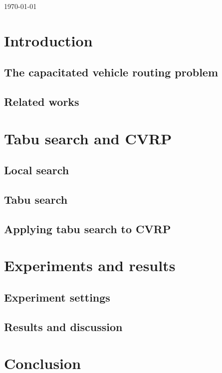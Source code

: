 \documentclass{report}
\begin{document}
\begin{titlepage}


	\vfill\vfill\vfill %

	{\large\today} %



	\vfill %
\end{titlepage}

\tableofcontents
\pagebreak

\chapter{Introduction}
\section{The capacitated vehicle routing problem}

\section{Related works}

\chapter{Tabu search and CVRP}
\section{Local search}

\section{Tabu search}

\section{Applying tabu search to CVRP}

\chapter{Experiments and results}
\section{Experiment settings}

\section{Results and discussion}

\chapter{Conclusion}
\end{document}
